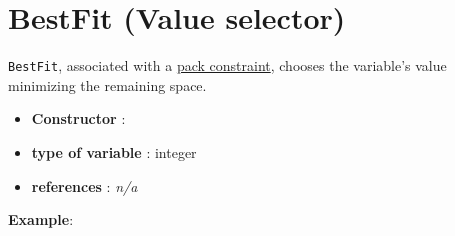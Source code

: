 \section{BestFit (Value selector)}\label{bestfit:bestfitvalselector}\hypertarget{bestfit:bestfitvalselector}{}
\begin{notedef}
  \texttt{BestFit}, associated with a \hyperlink{pack:packconstraint}{pack constraint}, chooses the variable's value minimizing the remaining space.
\end{notedef}

\begin{itemize}
	\item \textbf{Constructor} : 
	\item \textbf{type of variable} : integer
	\item \textbf{references} : \emph{n/a}
\end{itemize}

\textbf{Example}:
%


